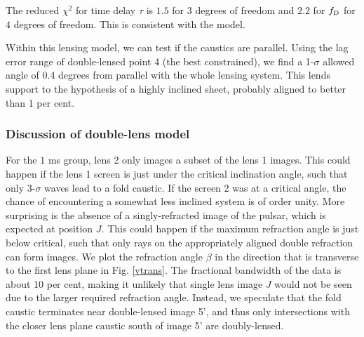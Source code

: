 \documentclass[useAMS,usenatbib]{mn2e}
\begin{document}
The reduced ${\chi}^2$ for time delay $\tau$ is $1.5$
for $3$ degrees of freedom
and $2.2$ for $f_{\rm D}$ for $4$ degrees of freedom.  This is consistent with the model.


Within this lensing model, we can test if the 
caustics are parallel.  Using the lag error range of double-lensed point 4 (the best
constrained), we find a 1-$\sigma$ allowed angle of 0.4 degrees from
parallel with the whole lensing system.  This lends support to the hypothesis of a 
highly inclined sheet, probably aligned to better than 1 per cent.




\subsubsection{Discussion of double-lens model}
\label{subsec:doublelens}
For the $1$ ms group, lens 2
only images a subset of the lens 1 images.  This could happen if the 
lens 1 screen is just under the critical inclination
angle, such that only 3-$\sigma$ waves lead to a fold caustic.  
If the screen 2 was at a critical angle, the chance of encountering a
somewhat less inclined system is of order unity.
More surprising is the absence of a singly-refracted
image of the pulsar, which is expected at position $J$.  This could
happen if the maximum refraction angle is just below critical, such
that only rays on the appropriately aligned double refraction can form
images.  
We plot the refraction angle $\beta$ in the
direction that is transverse to the first lens plane in Fig.
\ref{vtrans}.  
The fractional bandwidth of the data is about 10 per cent, making it unlikely that single lens
image $J$ would not be seen due to the larger required refraction
angle.  Instead, we speculate that the fold caustic terminates
near double-lensed image 5', and thus only intersections with the closer
lens plane caustic south of image 5' are doubly-lensed.
\end{document}
